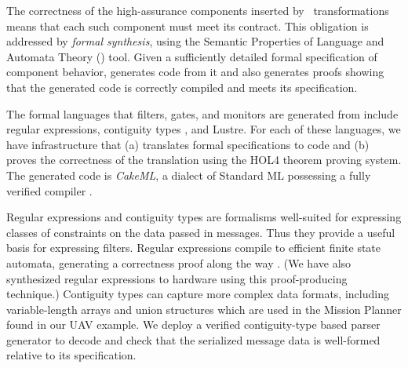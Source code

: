 The correctness of the high-assurance components inserted
by \briefcase \ transformations means that each such component
must meet its \agree{} contract. This obligation is addressed by
\emph{formal synthesis}, using the Semantic Properties of Language
and Automata Theory (\splat) tool.  Given a sufficiently detailed formal
specification of component behavior, \splat{} generates code
from it and also generates proofs showing that the generated code is
correctly compiled and meets its specification.

The formal languages that filters, gates, and monitors are generated
from include regular expressions, contiguity types
\cite{contiguity-types}, and Lustre.
For each of these languages, we have infrastructure
that (a) translates formal specifications to code and (b) proves the
correctness of the translation using the HOL4 theorem proving system.
The generated code is \emph{CakeML}, a dialect of Standard ML
possessing a fully verified compiler \cite{cakeml}.


Regular expressions and contiguity types are formalisms well-suited
for expressing classes of constraints on the data passed in
messages. Thus they provide a useful basis for expressing
filters. Regular expressions compile to efficient finite state
automata, generating a correctness proof along the way
\cite{case-verified-filter}.  (We have also synthesized regular
expressions to hardware using this proof-producing
technique.)
Contiguity types can capture more complex
data formats, including variable-length arrays and union structures
which are used in the Mission Planner found in our UAV example.
We deploy a verified contiguity-type based parser generator
to decode and check that the serialized message data is well-formed
relative to its specification.

